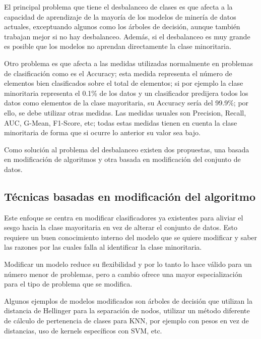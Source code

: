 El principal problema que tiene el desbalanceo de clases es que afecta a la capacidad de aprendizaje de la mayoría de los modelos de minería de datos actuales, exceptuando algunos como los árboles de decisión, aunque también trabajan mejor si no hay desbalanceo. Además, si el desbalanceo es muy grande es posible que los modelos no aprendan directamente la clase minoritaria.\newline

Otro problema es que afecta a las medidas utilizadas normalmente en problemas de clasificación como es el Accuracy; esta medida representa el número de elementos bien clasificados sobre el total de elementos; si por ejemplo la clase minoritaria representa el 0.1\% de los datos y un clasificador predijera todos los datos como elementos de la clase mayoritaria, su Accuracy sería del 99.9\%; por ello, se debe utilizar otras medidas. Las medidas usuales son Precision, Recall, AUC, G-Mean, F1-Score, etc; todas estas medidas tienen en cuenta la clase minoritaria de forma que si ocurre lo anterior su valor sea bajo.\newline

Como solución al problema del desbalanceo existen dos propuestas, una basada en modificación de algoritmos y otra basada en modificación del conjunto de datos.
\subsection{Técnicas basadas en modificación del algoritmo}
Este enfoque se centra en modificar clasificadores ya existentes para aliviar el sesgo hacia la clase mayoritaria en vez de alterar el conjunto de datos. Esto requiere un buen conocimiento interno del modelo que se quiere modificar y saber las razones por las cuales falla al identificar la clase minoritaria.\newline

Modificar un modelo reduce su flexibilidad y por lo tanto lo hace válido para un número menor de problemas, pero a cambio ofrece una mayor especialización para el tipo de problema que se modifica.\newline

Algunos ejemplos de modelos modificados son árboles de decisión que utilizan la distancia de Hellinger para la separación de nodos, utilizar un método diferente de cálculo de pertenencia de clases para KNN, por ejemplo con pesos en vez de distancias, uso de kernels específicos con SVM, etc.\newline

